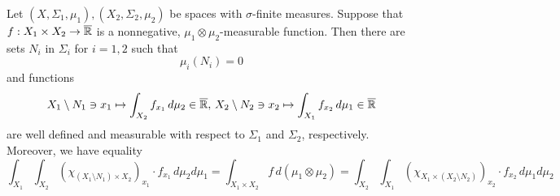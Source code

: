 \begin{theorem}\label{theorem:Tonellis_theorem_for_mu_measurable_functions}
Let $(X,\Sigma_1,\mu_1), (X_2,\Sigma_2,\mu_2)$ be spaces with $\sigma$-finite measures. Suppose that $f:X_1\times X_2\rightarrow \overline{{\mathbb R}}$ is a nonnegative, $\mu_1\otimes \mu_2$-measurable function. Then there are sets $N_i$ in $\Sigma_i$ for $i=1,2$ such that
$$\mu_i(N_i) = 0$$ 
and functions
$$X_1\setminus N_1\ni x_1\mapsto \int_{X_2}f_{x_1}\,d\mu_2\in \overline{{\mathbb R}},\,X_2\setminus N_2\ni x_2\mapsto \int_{X_1}f_{x_2}\,d\mu_1\in \overline{{\mathbb R}}$$
are well defined and measurable with respect to $\Sigma_1$ and $\Sigma_2$, respectively. Moreover, we have equality
$$\int_{X_1}\int_{X_2} \left(\chi_{\left(X_1\setminus N_1\right)\times X_2}\right)_{x_1}\cdot f_{x_1}\,d\mu_2d\mu_1 = \int_{X_1\times X_2}f\,d(\mu_1\otimes \mu_2) = \int_{X_2}\int_{X_1} \left(\chi_{X_1\times \left(X_2\setminus N_2\right)}\right)_{x_2}\cdot f_{x_2}\,d\mu_1d\mu_2$$
\end{theorem}
